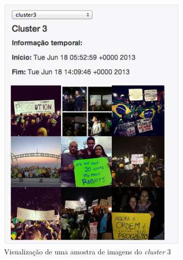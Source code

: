 \begin{figure}[t!]
\centering
	\begin{subfigure}[b]{0.45\textwidth}
	\centering
	\includegraphics[width=0.9\linewidth]{./figures/olhopassarinho/c3_ex1_im33_e33_t33_1819}
	\caption{Visualização de uma amostra de imagens do \textit{cluster} 3}
	\label{subfig:im41}
	\end{subfigure}
	~
	\begin{subfigure}[b]{0.45\textwidth}
	\centering

\end{subfigure}
\end{figure}

